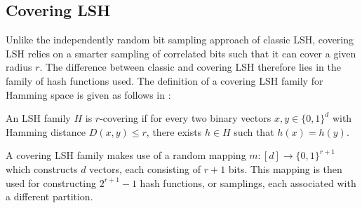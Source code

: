 \subsection{Covering LSH}
\label{background-covering-lsh}

Unlike the independently random bit sampling approach of classic LSH, covering LSH relies on a smarter sampling of correlated bits such that it can cover a given radius $r$. The difference between classic and covering LSH therefore lies in the family of hash functions used. The definition of a covering LSH family for Hamming space is given as follows in \cite{DBLP:journals/corr/PhamP16}:

\begin{definition}
  An LSH family $H$ is $r$-covering if for every two binary vectors $x, y \in \{0, 1\}^d$ with Hamming distance $D(x, y) \leq r$, there exists $h \in H$ such that $h(x) = h(y)$.
\end{definition}

A covering LSH family makes use of a random mapping $m \colon [d] \rightarrow \{0, 1\}^{r + 1}$ which constructs $d$ vectors, each consisting of $r + 1$ bits. This mapping is then used for constructing $2^{r + 1} - 1$ hash functions, or samplings, each associated with a different partition.
